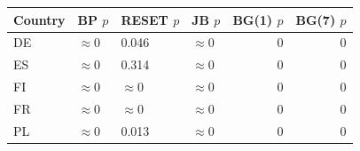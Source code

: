 
\begin{tabular}{llllrr}
\toprule
Country & BP $p$ & RESET $p$ & JB $p$ & BG(1) $p$ & BG(7) $p$\\
\midrule
DE & $\approx 0$ & 0.046 & $\approx 0$ & 0 & 0\\
ES & $\approx 0$ & 0.314 & $\approx 0$ & 0 & 0\\
FI & $\approx 0$ & $\approx 0$ & $\approx 0$ & 0 & 0\\
FR & $\approx 0$ & $\approx 0$ & $\approx 0$ & 0 & 0\\
PL & $\approx 0$ & 0.013 & $\approx 0$ & 0 & 0\\
\bottomrule
\end{tabular}
